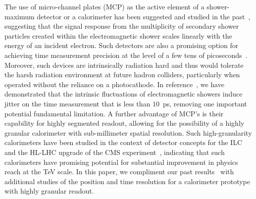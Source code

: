 \documentclass[12pt]{article}
\begin{document}
The use of micro-channel plates (MCP) as the active element of a shower-maximum 
detector or a calorimeter has been suggested and studied in the 
past~\cite{Derevshchikov:1990ej,Albayrak-Yetkin:2013xga}, 
suggesting that the signal response from the multiplicity of secondary
shower particles created within the electromagnetic shower scales linearly with the energy 
of an incident electron. Such detectors are also a promising option for achieving time measurement 
precision at the level of a few tens of 
picoseconds~\cite{MCPFastCaloNIMA,Ronzhin:2015pba,Ronzhin2015288,Brianza2015216}. 
Moreover, such devices are intrinsically radiation hard and thus would tolerate the harsh
radiation environment at future hadron colliders, particularly when operated 
without the reliance on a photocathode. 
In reference~\cite{Ronzhin2015288}, we have demonstrated that the intrinsic 
fluctuations of electromagnetic showers induce jitter on the time measurement
that is less than $10$~ps, removing one important potential fundamental limitation.
A further advantage of MCP's is their capability for highly segmented readout, allowing for 
the possibility of a highly granular calorimeter with sub-millimeter spatial resolution. Such
high-granularity calorimeters have been studied in the context of detector
concepts for the ILC~\cite{Grondin:2010fe} and the HL-LHC upgrade of the CMS 
experiment~\cite{Butler:2020886}, indicating that such calorimeters have promising 
potential for substantial improvement in physics reach at the TeV scale. In this 
paper, we compliment our past results~\cite{Anderson:2015gha,MCPFastCaloNIMA,Ronzhin:2015pba,Ronzhin2015288} with additional studies of the position and time resolution for a calorimeter prototype with highly granular readout.
\end{document}
